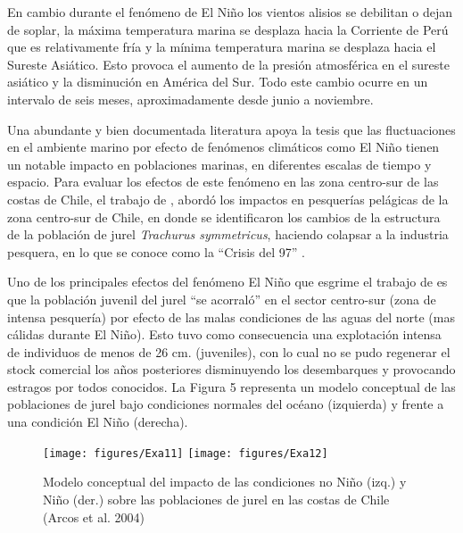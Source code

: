 \documentclass{umagthesis}
\begin{document}
En cambio durante el fenómeno de El Niño los vientos alisios se debilitan o dejan de soplar, la máxima temperatura marina se desplaza hacia la Corriente de Perú que es relativamente fría y la mínima temperatura marina se desplaza hacia el Sureste Asiático. Esto provoca el aumento de la presión atmosférica en el sureste asiático y la disminución en América del Sur. Todo este cambio ocurre en un intervalo de seis meses, aproximadamente desde junio a noviembre.

Una abundante y bien documentada literatura apoya la tesis que las fluctuaciones en el ambiente marino por efecto de fenómenos climáticos como El Niño tienen un notable impacto en poblaciones marinas, en diferentes escalas de tiempo y espacio. Para evaluar los efectos de este fenómeno en las zona centro-sur de las costas de Chile, el trabajo de \autocite{Arcos2004}, abordó los impactos en pesquerías pelágicas de la zona centro-sur de Chile, en donde se identificaron los cambios de la estructura de la población de jurel \emph{Trachurus symmetricus}, haciendo colapsar a la industria pesquera, en lo que se conoce como la ``Crisis del 97'' \autocite{Arcos2004}.

Uno de los principales efectos del fenómeno El Niño que esgrime el trabajo de \autocite{Arcos2004} es que la población juvenil del jurel ``se acorraló'' en el sector centro-sur (zona de intensa pesquería) por efecto de las malas condiciones de las aguas del norte (mas cálidas durante El Niño). Esto tuvo como consecuencia una explotación intensa de individuos de menos de 26 cm. (juveniles), con lo cual no se pudo regenerar el stock comercial los años posteriores disminuyendo los desembarques y provocando estragos por todos conocidos. La Figura 5 representa un modelo conceptual de las poblaciones de jurel bajo condiciones normales del océano (izquierda) y frente a una condición El Niño (derecha).

\begin{figure}

{\centering \texttt{[image: figures/Exa11]} \texttt{[image: figures/Exa12]} 

}

\caption{Modelo conceptual del impacto de las condiciones no Niño (izq.) y Niño (der.) sobre las poblaciones de jurel en las costas de Chile (Arcos et al. 2004)}\label{fig:unnamed-chunk-5}
\end{figure}
\end{document}
